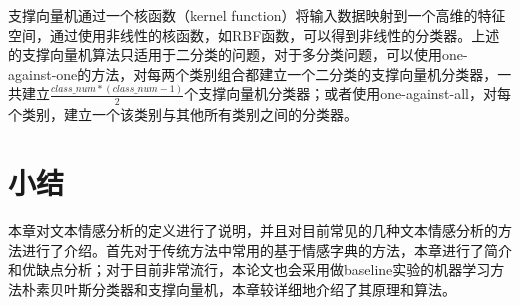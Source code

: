 支撑向量机通过一个核函数（kernel function）将输入数据映射到一个高维的特征空间，通过使用非线性的核函数，如RBF函数，可以得到非线性的分类器。上述的支撑向量机算法只适用于二分类的问题，对于多分类问题，可以使用one-against-one的方法，对每两个类别组合都建立一个二分类的支撑向量机分类器，一共建立$\frac{class\_num * (class\_num - 1)}{2}$个支撑向量机分类器；或者使用one-against-all，对每个类别，建立一个该类别与其他所有类别之间的分类器。

\section{小结}
本章对文本情感分析的定义进行了说明，并且对目前常见的几种文本情感分析的方法进行了介绍。首先对于传统方法中常用的基于情感字典的方法，本章进行了简介和优缺点分析；对于目前非常流行，本论文也会采用做baseline实验的机器学习方法朴素贝叶斯分类器和支撑向量机，本章较详细地介绍了其原理和算法。
